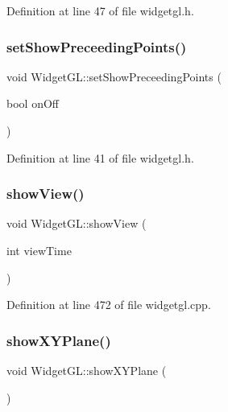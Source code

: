 Definition at line 47 of file widgetgl.\+h.

\mbox{\label{class_widget_g_l_aa2eeb46f931541bfbe3fa256c81a3f70}} 
\subsubsection{\texorpdfstring{setShowPreceedingPoints()}{setShowPreceedingPoints()}}
{\footnotesize\ttfamily void Widget\+G\+L\+::set\+Show\+Preceeding\+Points (\begin{DoxyParamCaption}\item[{bool}]{on\+Off }\end{DoxyParamCaption})\hspace{0.3cm}{\ttfamily [inline]}}



Definition at line 41 of file widgetgl.\+h.

\mbox{\label{class_widget_g_l_af96c96186d67d2bd07b6ca49ae275bd0}} 
\subsubsection{\texorpdfstring{showView()}{showView()}}
{\footnotesize\ttfamily void Widget\+G\+L\+::show\+View (\begin{DoxyParamCaption}\item[{int}]{view\+Time }\end{DoxyParamCaption})}



Definition at line 472 of file widgetgl.\+cpp.

\mbox{\label{class_widget_g_l_a27962161ace8397e3c8575d27d32809b}} 
\subsubsection{\texorpdfstring{showXYPlane()}{showXYPlane()}}
{\footnotesize\ttfamily void Widget\+G\+L\+::show\+X\+Y\+Plane (\begin{DoxyParamCaption}{ }\end{DoxyParamCaption})}



